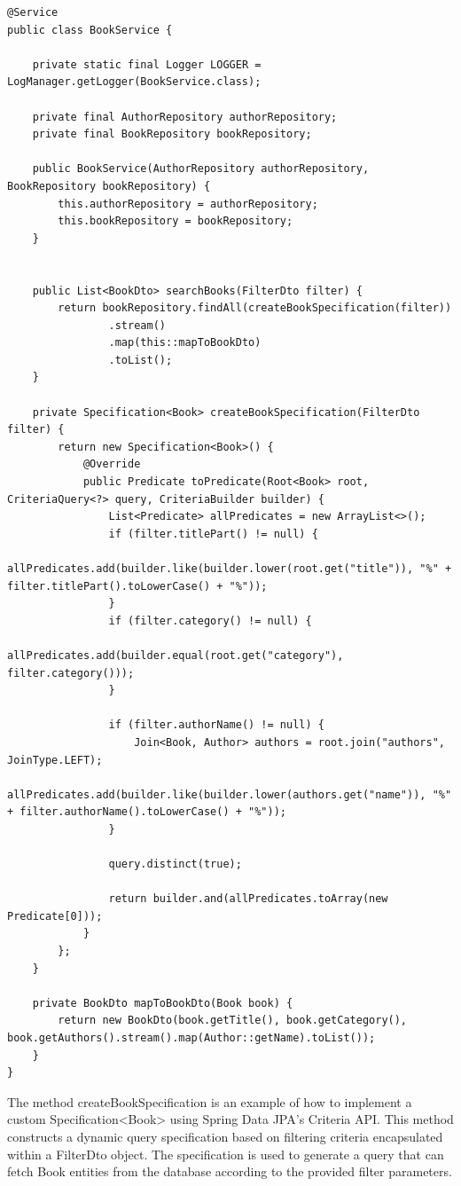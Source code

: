 \begin{lstlisting}
@Service
public class BookService {

    private static final Logger LOGGER = LogManager.getLogger(BookService.class);

    private final AuthorRepository authorRepository;
    private final BookRepository bookRepository;

    public BookService(AuthorRepository authorRepository, BookRepository bookRepository) {
        this.authorRepository = authorRepository;
        this.bookRepository = bookRepository;
    }


    public List<BookDto> searchBooks(FilterDto filter) {
        return bookRepository.findAll(createBookSpecification(filter))
                .stream()
                .map(this::mapToBookDto)
                .toList();
    }

    private Specification<Book> createBookSpecification(FilterDto filter) {
        return new Specification<Book>() {
            @Override
            public Predicate toPredicate(Root<Book> root, CriteriaQuery<?> query, CriteriaBuilder builder) {
                List<Predicate> allPredicates = new ArrayList<>();
                if (filter.titlePart() != null) {
                    allPredicates.add(builder.like(builder.lower(root.get("title")), "%" + filter.titlePart().toLowerCase() + "%"));
                }
                if (filter.category() != null) {
                    allPredicates.add(builder.equal(root.get("category"), filter.category()));
                }
 
                if (filter.authorName() != null) {
                    Join<Book, Author> authors = root.join("authors", JoinType.LEFT);
                    allPredicates.add(builder.like(builder.lower(authors.get("name")), "%" + filter.authorName().toLowerCase() + "%"));
                }

                query.distinct(true);

                return builder.and(allPredicates.toArray(new Predicate[0]));
            }
        };
    }

    private BookDto mapToBookDto(Book book) {
        return new BookDto(book.getTitle(), book.getCategory(), book.getAuthors().stream().map(Author::getName).toList());
    }
}
\end{lstlisting}

The method createBookSpecification is an example of how to implement a custom Specification<Book> using Spring Data JPA's Criteria API. This method constructs a dynamic query specification based on filtering criteria encapsulated within a FilterDto object. The specification is used to generate a query that can fetch Book entities from the database according to the provided filter parameters.

